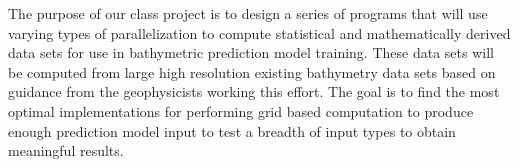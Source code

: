 \par
The purpose of our class project is to design a series of programs that will use varying types of parallelization to compute statistical and mathematically derived data sets for use in bathymetric prediction model training. 
These data sets will be computed from large high resolution existing bathymetry data sets based on guidance from the geophysicists working this effort. 
The goal is to find the most optimal implementations for performing grid based computation to produce enough prediction model input to test a breadth of input types to obtain meaningful results.
